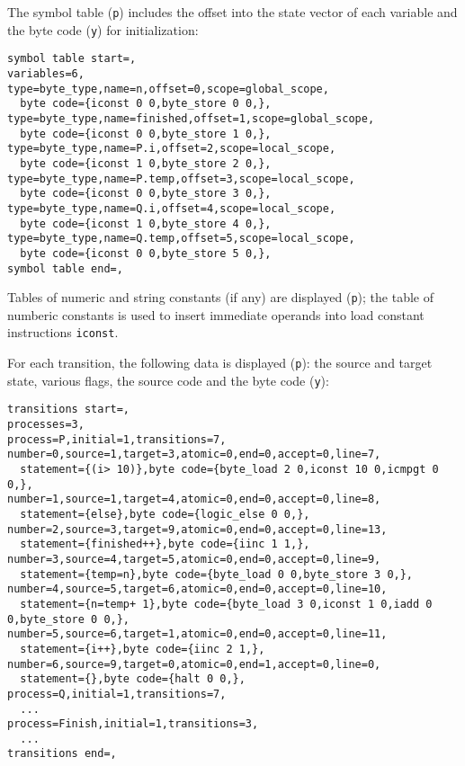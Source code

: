 \documentclass[11pt]{article}
\newcommand*{\p}[1]{\texttt{#1}}
\begin{document}
The symbol table (\p{p}) includes the offset into the state vector of
each variable and the byte code (\p{y}) for initialization:

\begin{footnotesize}
\begin{verbatim}
symbol table start=,
variables=6,
type=byte_type,name=n,offset=0,scope=global_scope,
  byte code={iconst 0 0,byte_store 0 0,},
type=byte_type,name=finished,offset=1,scope=global_scope,
  byte code={iconst 0 0,byte_store 1 0,},
type=byte_type,name=P.i,offset=2,scope=local_scope,
  byte code={iconst 1 0,byte_store 2 0,},
type=byte_type,name=P.temp,offset=3,scope=local_scope,
  byte code={iconst 0 0,byte_store 3 0,},
type=byte_type,name=Q.i,offset=4,scope=local_scope,
  byte code={iconst 1 0,byte_store 4 0,},
type=byte_type,name=Q.temp,offset=5,scope=local_scope,
  byte code={iconst 0 0,byte_store 5 0,},
symbol table end=,
\end{verbatim}
\end{footnotesize}

Tables of numeric and string constants (if any) are displayed (\p{p});
the table of numberic constants is used to insert immediate operands into load
constant instructions \p{iconst}.

For each transition, the following data is displayed (\p{p}): the source
and target state, various flags, the source code and the byte code
(\p{y}):

\begin{footnotesize}
\begin{verbatim}
transitions start=,
processes=3,
process=P,initial=1,transitions=7,
number=0,source=1,target=3,atomic=0,end=0,accept=0,line=7,
  statement={(i> 10)},byte code={byte_load 2 0,iconst 10 0,icmpgt 0 0,},
number=1,source=1,target=4,atomic=0,end=0,accept=0,line=8,
  statement={else},byte code={logic_else 0 0,},
number=2,source=3,target=9,atomic=0,end=0,accept=0,line=13,
  statement={finished++},byte code={iinc 1 1,},
number=3,source=4,target=5,atomic=0,end=0,accept=0,line=9,
  statement={temp=n},byte code={byte_load 0 0,byte_store 3 0,},
number=4,source=5,target=6,atomic=0,end=0,accept=0,line=10,
  statement={n=temp+ 1},byte code={byte_load 3 0,iconst 1 0,iadd 0 0,byte_store 0 0,},
number=5,source=6,target=1,atomic=0,end=0,accept=0,line=11,
  statement={i++},byte code={iinc 2 1,},
number=6,source=9,target=0,atomic=0,end=1,accept=0,line=0,
  statement={},byte code={halt 0 0,},
process=Q,initial=1,transitions=7,
  ...
process=Finish,initial=1,transitions=3,
  ...
transitions end=,
\end{verbatim}
\end{footnotesize}
\end{document}
